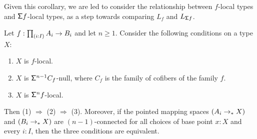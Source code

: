 Given this corollary, we are led to consider the relationship between $f$-local types and $\mathsf{\Sigma} f$-local types, as a step towards comparing $L_f$ and $L_{\mathsf{\Sigma} f}$.

\begin{thm}\label{theorem:characterizinglocalness}
    Let $f: \prd{i:I} A_i \to B_i$ and let $n \geq 1$.
    Consider the following conditions on a type $X$:
    \begin{enumerate}
    \item $X$ is $f$-local.
    \item $X$ is $\mathsf{\Sigma}^{n-1} C_f$-null,
    where $C_f$ is the family of cofibers of the family $f$. 
    \item $X$ is $\mathsf{\Sigma}^{n} f$-local.
    \end{enumerate}
    Then (1) $\Rightarrow$ (2) $\Rightarrow$ (3).
    Moreover, if the pointed mapping spaces $(A_i \to_{\ast} X)$ and $(B_i \to_{\ast} X)$
    are $(n-1)$-connected for all choices of base point $x : X$
    and every $i : I$,
    then the three conditions are equivalent.
\end{thm}

